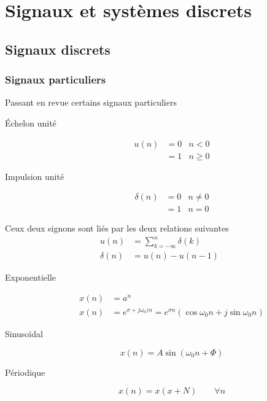 \chapter{Signaux et systèmes discrets}
\section{Signaux discrets}
	\subsection{Signaux particuliers}
	Passant en revue certains signaux particuliers
	\begin{description}
	\item[Échelon unité]
	\begin{equation}
	\begin{array}{lll}
	u(n) &= 0 & n<0\\
	&=1 &n\geq 0
	\end{array}
	\end{equation}
	\item[Impulsion unité]
	\begin{equation}
	\begin{array}{lll}
	\delta(n) &= 0 & n\neq0\\
	&=1 & n=0
	\end{array}		
	\end{equation}
	\end{description}
	Ceux deux signons sont liés par les deux relations suivantes
	\begin{equation}
	\begin{array}{ll}
	u(n) &= \sum_{k=-\infty}^n \delta(k)\\
	\delta(n) &= u(n)-u(n-1)
	\end{array}
	\end{equation}
	\begin{description}
	\item[Exponentielle]
	\begin{equation}
	\begin{array}{ll}
	x(n) &= a^n\\
	x(n) &= e^{\sigma+j\omega_0)n} = e^{\sigma n}(\cos\omega_0n+j\sin\omega_0n)
	\end{array}
	\end{equation}
	\item[Sinusoïdal]
	\begin{equation}
	x(n) = A\sin(\omega_0n+\Phi)
	\end{equation}
	\item[Périodique]
	\begin{equation}
	x(n) = x(x+N)\qquad \forall n
	\end{equation}
	\end{description}
	
